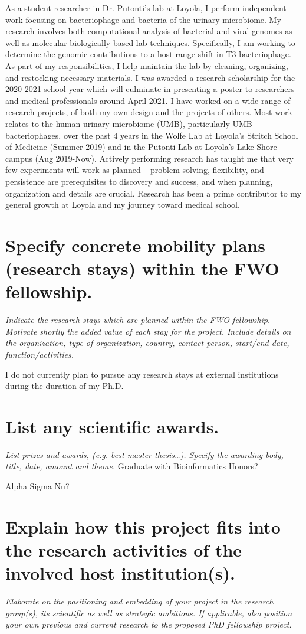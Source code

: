{As a student researcher in Dr. Putonti’s lab at Loyola, I perform independent work focusing on bacteriophage and bacteria of the urinary
microbiome. My research involves both computational analysis of bacterial and viral genomes as well as molecular biologically-based lab
techniques. Specifically, I am working to determine the genomic contributions to a host range shift in T3 bacteriophage. As part of my
responsibilities, I help maintain the lab by cleaning, organizing, and restocking necessary materials. I was awarded a research
scholarship for the 2020-2021 school year which will culminate in presenting a poster to researchers and medical professionals around
April 2021.
I have worked on a wide range of research projects, of both my own design and the projects of others. Most work relates to the human
urinary microbiome (UMB), particularly UMB bacteriophages, over the past 4 years in the Wolfe Lab at Loyola’s Stritch School of
Medicine (Summer 2019) and in the Putonti Lab at Loyola’s Lake Shore campus (Aug 2019-Now). Actively performing research has
taught me that very few experiments will work as planned -- problem-solving, flexibility, and persistence are prerequisites to discovery and
success, and when planning, organization and details are crucial. Research has been a prime contributor to my general growth at Loyola
and my journey toward medical school.


\section{Specify concrete mobility plans (research stays) within the FWO fellowship.}
\textit{
Indicate the research stays which are planned within the FWO fellowship. 
Motivate shortly the added value of each stay for the project. Include details on the organization, type of organization, country, contact person, start/end date, function/activities. 
}

I do not currently plan to pursue any research stays at external institutions during the duration of my Ph.D.


\section{List any scientific awards.}
\textit{
List prizes and awards, (e.g. best master thesis…). Specify the awarding body, title, date, amount and theme.
}
Graduate with Bioinformatics Honors?

Alpha Sigma Nu?


\section{Explain how this project fits into the research activities of the involved host institution(s).}
\textit{
Elaborate on the positioning and embedding of your project in the research group(s), its scientific as well as strategic ambitions. 
If applicable, also position your own previous and current research to the proposed PhD fellowship project.
}

}
